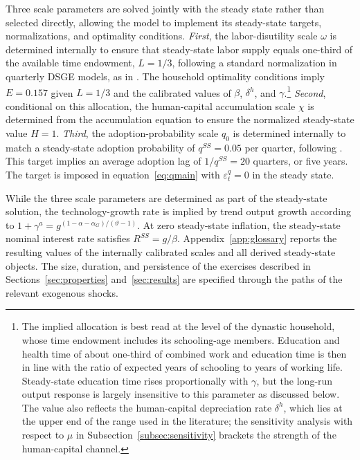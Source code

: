 \documentclass[a4paper,11pt]{article}
\begin{document}
Three scale parameters are solved jointly with the steady state rather than selected directly, allowing the model to implement its steady-state targets, normalizations, and optimality conditions.
\emph{First}, the labor-disutility scale $\omega$ is determined internally to ensure that steady-state labor supply equals one-third of the available time endowment, $L=1/3$, following a standard normalization in quarterly DSGE models, as in \citet{Cantoreetal2017}.
The household optimality conditions imply $E=0.157$ given $L=1/3$ and the calibrated values of $\beta$, $\delta^h$, and $\gamma$.\footnote{The implied allocation is best read at the level of the dynastic household, whose time endowment includes its schooling-age members.
Education and health time of about one-third of combined work and education time is then in line with the ratio of expected years of schooling to years of working life. Steady-state education time rises proportionally with $\gamma$, but the long-run output response is largely insensitive to this parameter as discussed below.
The value also reflects the human-capital depreciation rate $\delta^h$, which lies at the upper end of the range used in the literature; the sensitivity analysis with respect to $\mu$ in Subsection~\ref{subsec:sensitivity} brackets the strength of the human-capital channel.}
\emph{Second}, conditional on this allocation, the human-capital accumulation scale $\chi$ is determined from the accumulation equation to ensure the normalized steady-state value $H=1$.
\emph{Third}, the adoption-probability scale $q_0$ is determined internally to match a steady-state adoption probability of $q^{SS}=0.05$ per quarter, following \citet{Anzoateguietal2019}.
This target implies an average adoption lag of $1/q^{SS}=20$ quarters, or five years.
The target is imposed in equation~\eqref{eq:qmain} with $\varepsilon_t^{q}=0$ in the steady state.

While the three scale parameters are determined as part of the steady-state solution, the technology-growth rate is implied by trend output growth according to $1+\gamma^a=g^{(1-\alpha-\alpha_G)/(\vartheta-1)}$.
At zero steady-state inflation, the steady-state nominal interest rate satisfies $R^{SS}=g/\beta$.
Appendix~\ref{app:glossary} reports the resulting values of the internally calibrated scales and all derived steady-state objects.
The size, duration, and persistence of the exercises described in Sections~\ref{sec:properties} and~\ref{sec:results} are specified through the paths of the relevant exogenous shocks.
\end{document}
